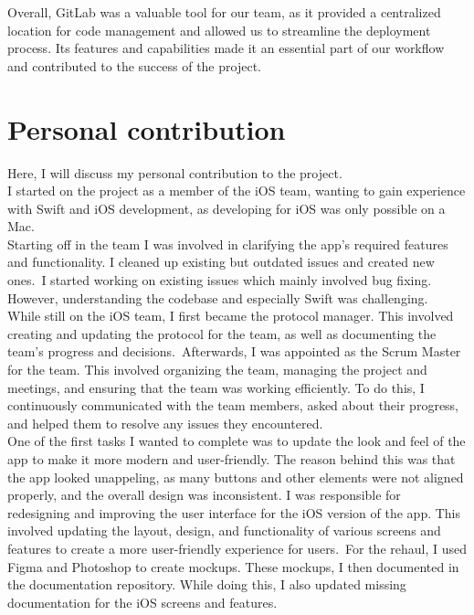 \documentclass[sf-font,usefira,english]{uulm/sp/article}
\begin{document}
Overall, GitLab was a valuable tool for our team, 
as it provided a centralized location for code management 
and allowed us to streamline the deployment process. 
Its features and capabilities made it an essential part of our workflow 
and contributed to the success of the project.\\



\section{Personal contribution}

Here, I will discuss my personal contribution to the project.\\

I started on the project as a member of the iOS team,
wanting to gain experience with Swift and iOS development,
as developing for iOS was only possible on a Mac.\\

Starting off in the team I was involved in 
clarifying the app's required features and functionality.
I cleaned up existing but outdated issues and created new ones.\
I started working on existing issues which mainly involved bug fixing.
However, understanding the codebase and especially Swift was challenging.\\

While still on the iOS team, I first became the protocol manager.
This involved creating and updating the protocol for the team,
as well as documenting the team's progress and decisions.\
Afterwards, I was appointed as the Scrum Master for the team.
This involved organizing the team, managing the project and meetings,
and ensuring that the team was working efficiently.
To do this, I continuously communicated with the team members,
asked about their progress, and helped them to resolve any issues they encountered.
\\

One of the first tasks I wanted to complete was 
to update the look and feel of the app to make it more modern and user-friendly.
The reason behind this was that the app looked unappeling,
as many buttons and other elements were not aligned properly,
and the overall design was inconsistent.
I was responsible for redesigning and improving the user interface 
for the iOS version of the app. 
This involved updating the layout, design, and functionality 
of various screens and features to create a more user-friendly 
experience for users.\
For the rehaul, I used Figma and Photoshop to create mockups.
These mockups, I then documented in the documentation repository.
While doing this, I also updated missing documentation
for the iOS screens and features.\\
\end{document}
